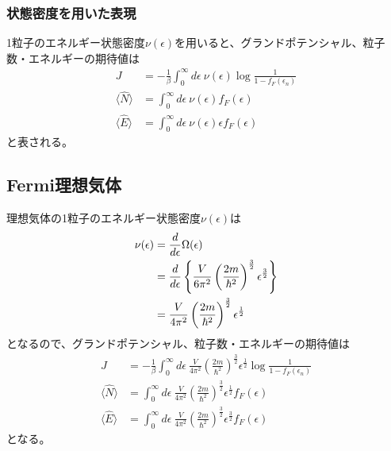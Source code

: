 \documentclass{jsarticle}  %
\numberwithin{equation}{section} %
\numberwithin{figure}{section}
\begin{document}
\subsubsection{状態密度を用いた表現}
    1粒子のエネルギー状態密度$\nu (\epsilon)$を用いると、グランドポテンシャル、粒子数・エネルギーの期待値は
    \begin{align}
        J &= -\frac{1}{\beta} \int_{0}^{\infty} d\epsilon\ \nu (\epsilon) \log \frac{1}{1 - f_F (\epsilon_n)} \\
        \langle \hat{N} \rangle &= \int_0^{\infty} d\epsilon\ \nu (\epsilon) f_F(\epsilon) \\
        \langle \hat{E} \rangle &= \int_0^{\infty} d\epsilon\  \nu (\epsilon) \epsilon f_F(\epsilon)
    \end{align}
    と表される。
\subsection{Fermi理想気体}
    理想気体の1粒子のエネルギー状態密度$\nu (\epsilon)$は
    \begin{align}
        \nu (\epsilon) &= \frac{d}{d\epsilon} \Omega (\epsilon) \notag \\
        &= \frac{d}{d\epsilon} \left\{ \frac{V}{6 \pi^2} \left( \frac{2m}{\hbar^2} \right)^{\frac{3}{2}} \epsilon^\frac{3}{2} \right\} \notag \\
        &= \frac{V}{4 \pi^2} \left( \frac{2m}{\hbar^2} \right)^{\frac{3}{2}} \epsilon^\frac{1}{2} 
    \end{align}
    となるので、グランドポテンシャル、粒子数・エネルギーの期待値は
    \begin{align}
        J &= -\frac{1}{\beta} \int_{0}^{\infty} d\epsilon\ \frac{V}{4 \pi^2} \left( \frac{2m}{\hbar^2} \right)^{\frac{3}{2}} \epsilon^\frac{1}{2} \log \frac{1}{1 - f_F (\epsilon_n)} \\
        \langle \hat{N} \rangle &= \int_0^{\infty} d\epsilon\ \frac{V}{4 \pi^2} \left( \frac{2m}{\hbar^2} \right)^{\frac{3}{2}} \epsilon^\frac{1}{2} f_F(\epsilon) \\
        \langle \hat{E} \rangle &= \int_0^{\infty} d\epsilon\  \frac{V}{4 \pi^2} \left( \frac{2m}{\hbar^2} \right)^{\frac{3}{2}} \epsilon^\frac{3}{2} f_F(\epsilon)
    \end{align}
    となる。
\end{document}

